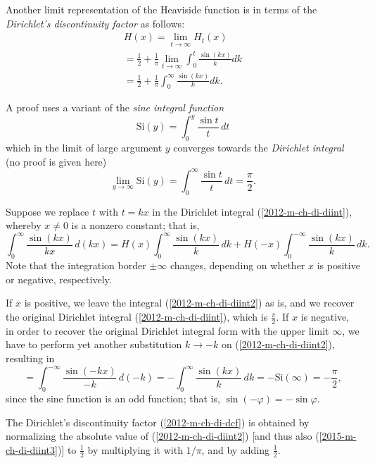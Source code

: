 Another limit representation of the Heaviside function is in terms of the
{\em Dirichlet's discontinuity factor} as follows:
\begin{equation}
\begin{split}
H(x)= \lim_{t \rightarrow \infty} H_t (x)
\\
= \frac{1}{2}+\frac{1}{\pi }\lim_{t \rightarrow \infty}\int_0^t \frac{\sin (kx)}{k} dk
\\
=
\frac{1}{2}+\frac{1}{\pi }\int_0^\infty \frac{\sin (kx)}{k} dk
.
\end{split}
\label{2012-m-ch-di-dcf}
\end{equation}

{\color{OliveGreen}
\bproof
A proof\cite{maor1998} uses a variant
of the {\em sine integral function}
\begin{equation}
\textrm{Si}(y) = \int_0^y \frac{\sin t}{t} \,dt
\end{equation}
which in the limit of large argument $y$ converges towards
the {\em Dirichlet integral}   (no proof is given here)
\begin{equation}
\lim_{y \rightarrow  \infty}\textrm{Si}(y) = \int_0^\infty  \frac{\sin t}{t} \,dt= \frac{\pi}{2}.
\label{2012-m-ch-di-diint}
\end{equation}


Suppose we
replace $t$ with $t=kx$
in the Dirichlet integral (\ref{2012-m-ch-di-diint}),
whereby $x\neq 0$ is a nonzero constant; that is,
\begin{equation}
\int_0^\infty  \frac{\sin (kx)}{kx} \,d(kx)
= H(x)\int_0^{\infty}  \frac{\sin (kx)}{k} \,dk
+H(-x)\int_0^{-\infty}  \frac{\sin (kx)}{k} \,dk
.
\label{2012-m-ch-di-diint2}
\end{equation}
Note that the integration border $\pm \infty$ changes, depending on whether $x$ is positive or negative,
respectively.

If $x$ is positive, we leave the integral
(\ref{2012-m-ch-di-diint2})
as is, and we recover the original Dirichlet integral (\ref{2012-m-ch-di-diint}),
which is $\frac{\pi}{2}$.
If $x$ is negative,
in order to recover the original Dirichlet integral form with the upper limit $\infty$,
we have to perform yet another substitution $k \rightarrow -k$
on (\ref{2012-m-ch-di-diint2}), resulting in
\begin{equation}
= \int_0^{-\infty}  \frac{\sin (-kx)}{-k} \,d(-k)
= -\int_0^{\infty}  \frac{\sin (kx)}{k} \,dk
= - \textrm{Si}(\infty ) =  -\frac{\pi}{2}
,
\label{2015-m-ch-di-diint3}
\end{equation}
since the sine function is an odd function; that is, $\sin(-\varphi )=-\sin \varphi $.


The Dirichlet's discontinuity factor (\ref{2012-m-ch-di-dcf})
is obtained by normalizing the absolute value of
(\ref{2012-m-ch-di-diint2}) [and thus also
(\ref{2015-m-ch-di-diint3})]
to $\frac{1}{2}$
by multiplying  it with $1/\pi$, and by adding $\frac{1}{2}$.
\eproof
}



